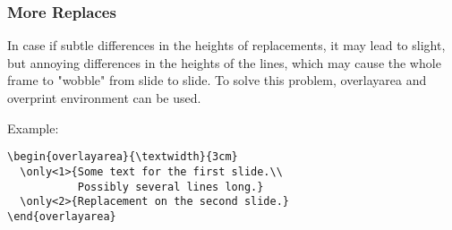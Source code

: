 \begin{frame}[fragile]
\frametitle{More Replaces}%

  In case if subtle differences in the heights of replacements, it may lead to slight, but annoying differences in the heights of the lines, which may cause the whole frame to "wobble" from slide to slide. To solve this problem, {\color{red} overlayarea} and {\color{red}overprint} environment can be used.

  \bigskip

  Example:

  \bigskip

  \begin{overlayarea}{\textwidth}{1.5cm}
  \end{overlayarea}

  \medskip

  \begin{footnotesize}
    \begin{verbatim}
\begin{overlayarea}{\textwidth}{3cm}
  \only<1>{Some text for the first slide.\\
           Possibly several lines long.}
  \only<2>{Replacement on the second slide.}
\end{overlayarea}
    \end{verbatim}
  \end{footnotesize}

\end{frame}
